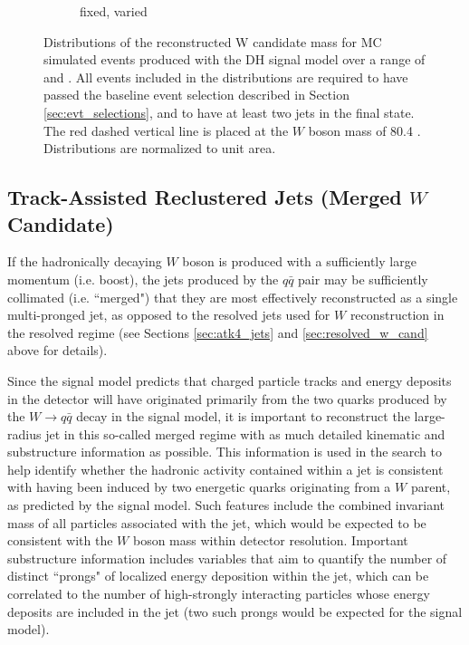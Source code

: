 \begin{figure}[h]
\begin{subfigure}[b]{0.49\textwidth}
	\caption{\ms fixed, \mZp varied}
	\label{fig:resolved_Wmass_reco_mZp}
	\end{subfigure}
	\caption[]{Distributions of the reconstructed W candidate mass for MC simulated events produced with the DH signal model over a range of \ms and \mZp. All events included in the distributions are required to have passed the baseline event selection described in Section \ref{sec:evt_selections}, and to have at least two \smallR jets in the final state. The red dashed vertical line is placed at the \(W\) boson mass of 80.4 \GeV. Distributions are normalized to unit area.}
	\label{fig:resolved_Wmass_reco}
\end{figure}

\subsection{Track-Assisted Reclustered Jets (Merged \(W\) Candidate)}
\label{sec:TAR_jets}

If the hadronically decaying \(W\) boson is produced with a sufficiently large momentum (i.e. boost), the jets produced by the \(q\bar{q}\) pair may be sufficiently collimated (i.e. ``merged") that they are most effectively reconstructed as a single multi-pronged \largeR jet, as opposed to the resolved \smallR jets used for \(W\) reconstruction in the resolved regime (see Sections \ref{sec:atk4_jets} and \ref{sec:resolved_w_cand} above for details). 

Since the signal model predicts that charged particle tracks and energy deposits in the detector will have originated primarily from the two quarks produced by the \(W\rightarrow q\bar{q}\) decay in the signal model, it is important to reconstruct the large-radius jet in this so-called merged regime with as much detailed kinematic and substructure information as possible. This information is used in the search to help identify whether the hadronic activity contained within a \largeR jet is consistent with having been induced by two energetic quarks originating from a \(W\) parent, as predicted by the signal model. Such features include the combined invariant mass \mTAR of all particles associated with the jet, which would be expected to be consistent with the \(W\) boson mass within detector resolution. Important substructure information includes variables that aim to quantify the number of distinct ``prongs" of localized energy deposition within the jet, which can be correlated to the number of high-\pt strongly interacting particles whose energy deposits are included in the jet (two such prongs would be expected for the signal model). 

